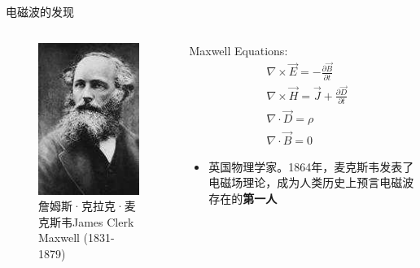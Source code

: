 \begin{frame}{电磁波的发现}
 \begin{columns}
  \begin{column}{0.35\linewidth}
   \begin{figure}
    \includegraphics[width=3.5cm]{Cha1//maxwell.jpg}
    \caption{詹姆斯·克拉克·麦克斯韦James Clerk Maxwell (1831-1879)}
   \end{figure}
  \end{column}
  \begin{column}{0.65\linewidth}
   Maxwell Equations:
   \begin{align*}
     & \nabla\times\vec E=-\frac{\partial \vec B}{\partial t}         \\
     & \nabla\times\vec H=\vec{J} +\frac{\partial \vec D}{\partial t} \\
     & \nabla\cdot\vec{D}=\rho                                        \\
     & \nabla\cdot\vec{B}=0
   \end{align*}
   \begin{itemize}
    \item 英国物理学家。1864年，麦克斯韦发表了电磁场理论，成为人类历史上预言电磁波存在的\textbf{第一人}
   \end{itemize}
  \end{column}
 \end{columns}
\end{frame}

